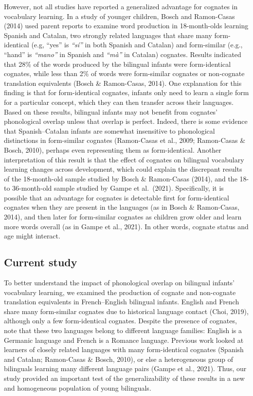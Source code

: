 \documentclass[
  ,man,floatsintext]{apa6}
\begin{document}
However, not all studies have reported a generalized advantage for cognates in vocabulary learning. In a study of younger children, Bosch and Ramon-Casas (2014) used parent reports to examine word production in 18-month-olds learning Spanish and Catalan, two strongly related languages that share many form-identical (e.g, ``yes'' is \emph{``sí''}  in both Spanish and Catalan) and form-similar (e.g., ``hand'' is \emph{``mano''}  in Spanish and \emph{``mà''}  in Catalan) cognates. Results indicated that 28\% of the words produced by the bilingual infants were form-identical cognates, while less than 2\% of words were form-similar cognates or non-cognate translation equivalents (Bosch \& Ramon-Casas, 2014). One explanation for this finding is that for form-identical cognates, infants only need to learn a single form for a particular concept, which they can then transfer across their languages. Based on these results, bilingual infants may not benefit from cognates' phonological overlap unless that overlap is perfect. Indeed, there is some evidence that Spanish--Catalan infants are somewhat insensitive to phonological distinctions in form-similar cognates (Ramon-Casas et al., 2009; Ramon-Casas \& Bosch, 2010), perhaps even representing them as form-identical. Another interpretation of this result is that the effect of cognates on bilingual vocabulary learning changes across development, which could explain the discrepant results of the 18-month-old sample studied by Bosch \& Ramon-Casas (2014), and the 18- to 36-month-old sample studied by Gampe et al.~(2021). Specifically, it is possible that an advantage for cognates is detectable first for form-identical cognates when they are present in the languages (as in Bosch \& Ramon-Casas, 2014), and then later for form-similar cognates as children grow older and learn more words overall (as in Gampe et al., 2021). In other words, cognate status and age might interact.

\hypertarget{current-study}{%
\subsection{Current study}\label{current-study}}

To better understand the impact of phonological overlap on bilingual infants' vocabulary learning, we examined the production of cognate and non-cognate translation equivalents in French--English bilingual infants. English and French share many form-similar cognates due to historical language contact (Choi, 2019), although only a few form-identical cognates. Despite the presence of cognates, note that these two languages belong to different language families: English is a Germanic language and French is a Romance language. Previous work looked at learners of closely related languages with many form-identical cognates (Spanish and Catalan; Ramon-Casas \& Bosch, 2010), or else a heterogeneous group of bilinguals learning many different language pairs (Gampe et al., 2021). Thus, our study provided an important test of the generalizability of these results in a new and homogeneous population of young bilinguals.
\end{document}
